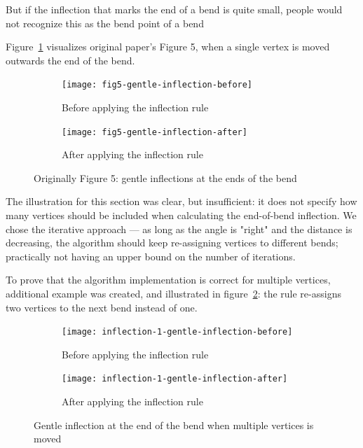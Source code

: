 \documentclass[a4paper]{article}
\begin{document}
\begin{displayquote}
    But if the inflection that marks the end of a bend is quite small, people
    would not recognize this as the bend point of a bend
\end{displayquote}

Figure~\ref{fig:fig5-gentle-inflection} visualizes original paper's Figure 5,
when a single vertex is moved outwards the end of the bend.

\begin{figure}[h]
    \centering
    \begin{subfigure}[b]{.49\textwidth}
        \texttt{[image: fig5-gentle-inflection-before]}
        \caption{Before applying the inflection rule}
    \end{subfigure}
    \hfill
    \begin{subfigure}[b]{.49\textwidth}
        \texttt{[image: fig5-gentle-inflection-after]}
        \caption{After applying the inflection rule}
    \end{subfigure}
    \caption{Originally Figure 5: gentle inflections at the ends of the bend}
    \label{fig:fig5-gentle-inflection}
\end{figure}

The illustration for this section was clear, but insufficient: it does not
specify how many vertices should be included when calculating the end-of-bend
inflection. We chose the iterative approach --- as long as the angle is "right"
and the distance is decreasing, the algorithm should keep re-assigning vertices
to different bends; practically not having an upper bound on the number of
iterations.

To prove that the algorithm implementation is correct for multiple vertices,
additional example was created, and illustrated in
figure~\ref{fig:inflection-1-gentle-inflection}: the rule re-assigns two
vertices to the next bend instead of one.

\begin{figure}[h]
    \centering
    \begin{subfigure}[b]{.45\textwidth}
        \texttt{[image: inflection-1-gentle-inflection-before]}
        \caption{Before applying the inflection rule}
    \end{subfigure}
    \hfill
    \begin{subfigure}[b]{.45\textwidth}
        \texttt{[image: inflection-1-gentle-inflection-after]}
        \caption{After applying the inflection rule}
    \end{subfigure}
    \caption{Gentle inflection at the end of the bend when multiple vertices is moved}
    \label{fig:inflection-1-gentle-inflection}
\end{figure}
\end{document}
